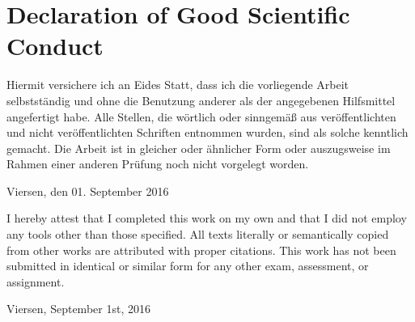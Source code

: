 \section*{Declaration of Good Scientific Conduct}

Hiermit versichere ich an Eides Statt, dass ich die vorliegende Arbeit selbstständig und ohne die Benutzung anderer als der angegebenen Hilfsmittel angefertigt habe. 
Alle Stellen, die wörtlich oder sinngemäß aus veröffentlichten und nicht veröffentlichten Schriften entnommen wurden, sind als solche kenntlich gemacht. 
Die Arbeit ist in gleicher oder ähnlicher Form oder auszugsweise im Rahmen einer anderen Prüfung noch nicht vorgelegt worden.
\vspace{15mm}
\begin{flushleft}
    Viersen, den 01. September 2016
\end{flushleft}
\vspace{30mm}
I hereby attest that I completed this work on my own and that I did not employ any tools other than those specified. 
All texts literally or semantically copied from other works are attributed with proper citations. 
This work has not been submitted in identical or similar form for any other exam, assessment, or assignment.
\vspace{15mm}
\begin{flushleft}
    Viersen, September 1st, 2016
\end{flushleft}
	